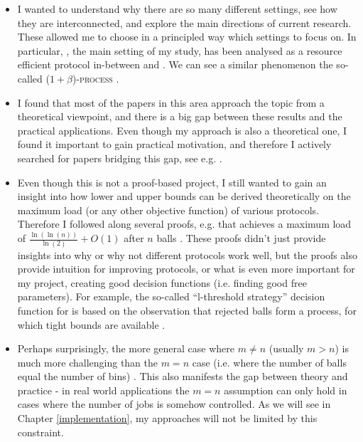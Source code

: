 \begin{itemize}
    \item 
    I wanted to understand why there are so many different settings, see how they are interconnected, and explore the main directions of current research. These allowed me to choose in a principled way which settings to focus on. In particular, \TwoThinning, the main setting of my study, has been analysed as a resource efficient protocol in-between \OneChoice and \TwoChoice. We can see a similar phenomenon the so-called \textsc{($1+\beta$)-process} \cite{peres2015oneplusbeta}.
    \item
    I found that most of the papers in this area approach the topic from a theoretical viewpoint, and there is a big gap between these results and the practical applications. Even though my approach is also a theoretical one, I found it important to gain practical motivation, and therefore I actively searched for papers bridging this gap, see e.g. \cite{wang2017twochoicerouting}.
    \item
    Even though this is not a proof-based project, I still wanted to gain an insight into how lower and upper bounds can be derived theoretically on the maximum load (or any other objective function) of various protocols. Therefore I followed along several proofs, e.g. that \TwoChoice achieves a maximum load of $\frac{\ln(\ln(n))}{\ln(2)} + O(1)$ after $n$ balls \cite{azar1999twochoice}. These proofs didn't just provide insights into why or why not different protocols work well, but the proofs also provide intuition for improving protocols, or what is even more important for my project, creating good decision functions (i.e. finding good free parameters). For example, the so-called ``l-threshold strategy'' decision function for \TwoThinning is based on the observation that rejected balls form a \OneChoice process, for which tight bounds are available \cite{feldheim2021thinning}.
    \item
    Perhaps surprisingly, the more general case where $m\neq n$ (usually $m>n$) is much more challenging than the $m=n$ case (i.e. where the number of balls equal the number of bins) \cite{berenbrink2006heavilyloaded}. This also manifests the gap between theory and practice - in real world applications the $m=n$ assumption can only hold in cases where the number of jobs is somehow controlled. As we will see in Chapter \ref{implementation}, my approaches will not be limited by this constraint.

\end{itemize}
